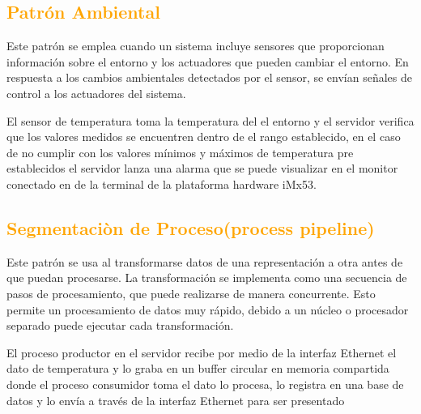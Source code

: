 \subsection{\textcolor{orange}{Patrón Ambiental}}

Este patrón se emplea cuando un sistema incluye sensores que proporcionan información sobre el entorno y los actuadores que pueden cambiar el entorno. En respuesta a los cambios ambientales detectados por el sensor, se envían señales de control a los actuadores del sistema.

El sensor de temperatura toma la temperatura del el entorno y el servidor verifica que los valores medidos se encuentren dentro de el rango establecido, en el caso de no cumplir con los valores mínimos y máximos de temperatura pre establecidos el servidor lanza una alarma que se puede visualizar en el monitor conectado en de la terminal de la plataforma hardware iMx53.

 
\subsection{\textcolor{orange}{Segmentaciòn de Proceso(process pipeline)}}

Este patrón se usa al transformarse datos de una representación a otra antes de que puedan procesarse. La transformación se implementa como una secuencia de pasos de procesamiento, que puede realizarse de manera concurrente. Esto permite un procesamiento de datos muy rápido, debido a un núcleo o procesador separado puede ejecutar cada transformación.

El proceso productor en el servidor recibe por medio de la interfaz Ethernet el dato de temperatura y lo graba en un buffer circular en memoria compartida donde el proceso consumidor toma el dato lo procesa, lo registra en una base de datos y lo envía a través de la interfaz Ethernet para ser presentado

